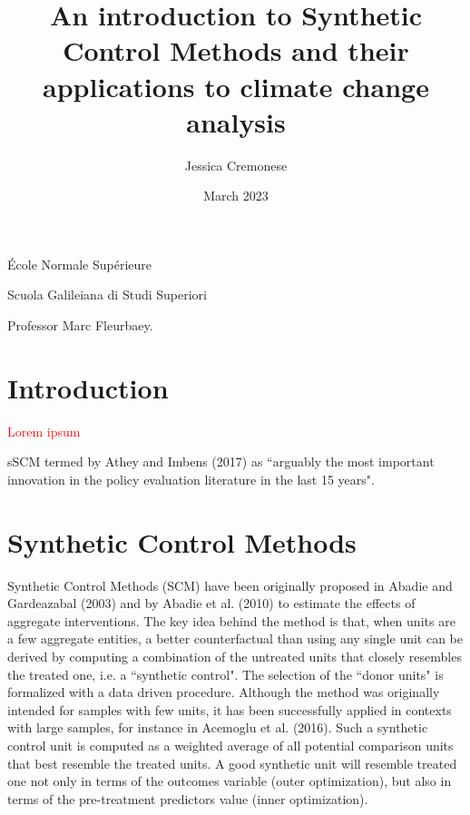 \documentclass[12pt,a4paper,draft]{article}
\begin{document}
\begin{titlepage}
\title{An introduction to Synthetic Control Methods and their applications to climate change analysis}
\author{Jessica Cremonese}
\date{March 2023}
\maketitle

\vspace{2cm}

\begin{center}
    École Normale Supérieure
\end{center}

\begin{center}
    Scuola Galileiana di Studi Superiori
\end{center}

\vspace{5cm}
Professor Marc Fleurbaey.


\end{titlepage}

\tableofcontents

\newpage


\section{Introduction} %

\textcolor{red}{Lorem ipsum}

sSCM termed by Athey and Imbens (2017) as ``arguably the most important innovation in the 
policy evaluation literature in the last 15 years".





\section{Synthetic Control Methods}  %

Synthetic Control Methods (SCM) have been originally proposed in Abadie and Gardeazabal 
(2003) and by Abadie et al. (2010) to estimate the effects of aggregate interventions.
The key idea behind the method is that, when units are a few aggregate entities, 
a better counterfactual than using any single unit can be derived by computing a 
combination of the untreated units that closely resembles the treated one, i.e. 
a ``synthetic control". The selection of the ``donor units" is formalized with a data
driven procedure.
Although the method was originally intended for samples with few units, it has been 
successfully applied in contexts with large samples, for instance in Acemoglu et 
al. (2016).
Such a synthetic control unit is computed as a weighted average of all potential 
comparison units that best resemble the treated units. A good synthetic unit will 
resemble treated one not only in terms of the outcomes variable (outer optimization), 
but also in terms of the pre-treatment predictors value (inner optimization).
\end{document}
